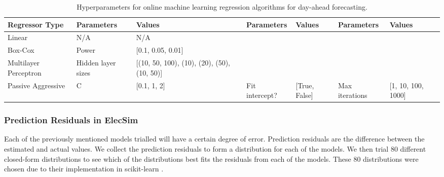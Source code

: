 \begin{table}
	
	\qquad
	\qquad
	\qquad
	\qquad
	\qquad
	\qquad
	\qquad
	\qquad
	\qquad
	
	\centering
	\begin{tabular}{@{}llp{2.5cm}lllp{1.6cm}@{}}
		\toprule
		\textbf{Regressor Type} & \textbf{Parameters} & \textbf{Values}                                  & \textbf{Parameters} & \textbf{Values}   & \textbf{Parameters} & \textbf{Values}        \\ \midrule
		Linear                  & N/A                 & N/A                                              &                     &                   &                     &                        \\
		Box-Cox                 & Power               & {[}0.1, 0.05, 0.01{]}                            &                     &                   &                     &                        \\
		Multilayer Perceptron   & Hidden layer sizes  & {[}(10, 50, 100), (10),  (20), (50), (10, 50){]} & 
		&                   &                     &                        \\ 
		Passive Aggressive      & C                   & {[}0.1, 1, 2{]}                                  & Fit intercept?      & {[}True, False{]} & Max iterations      & {[}1, 10, 100, 1000{]} \\
		\bottomrule
	\end{tabular}%
	\caption{Hyperparameters for online machine learning regression algorithms for day-ahead forecasting.}
	\label{table:hyperparameter-tuning-online}
\end{table}%


\subsubsection{Prediction Residuals in ElecSim}

Each of the previously mentioned models trialled will have a certain degree of error. Prediction residuals are the difference between the estimated and actual values. We collect the prediction residuals to form a distribution for each of the models. We then trial 80 different closed-form distributions to see which of the distributions best fits the residuals from each of the models. These 80 distributions were chosen due to their implementation in scikit-learn \cite{scikit-learn}.

